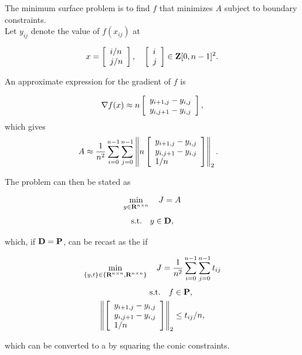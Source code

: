 \documentclass{article}
\begin{document}
    The minimum surface problem is to find $f$ that minimizes $A$ subject to boundary constraints.\\
    Let $y_{ij}$ denote the value of $f(x_{ij})$ at 
    
    \begin{align*}
        x=\left[\begin{array}{lllllllllllllllllll}i/n \\ j/n\end{array}\right],\quad  \left[\begin{array}{lllllllllllllllllll}i\\j\end{array}\right]\in\textbf{Z}[0,n-1]^2.
    \end{align*}
    
    An approximate expression for the gradient of $f$ is 

    \begin{align*}
        \nabla f(x)\approx n \left[\begin{array}{lllllllllllllllllll}y_{i+1,j}-y_{i,j}\\y_{i,j+1}-y_{i,j}\end{array}\right],
    \end{align*}
    which gives
    \begin{align*}
        A&\approx\frac{1}{n^2}\sum_{i=0}^{n-1}\sum_{j=0}^{n-1}
        \left\|n\left[\begin{array}{lllllllllllllllllll} y_{i+1,j}-y_{i,j}\\ y_{i,j+1}-y_{i,j} \\1/n\end{array}\right]\right\|_2.
    \end{align*}

    The problem can then be stated as

    \begin{align*}
        \min_{y\in\textbf{R}^{n\times n}}\quad J = A
    \end{align*}
    \begin{align*}
        \text{s.t.}\quad y\in\textbf{D},
    \end{align*}

    which, if $\textbf{D}=\textbf{P}$, can be recast as the \SOCP if 

    \begin{align*}
        \min_{\{y,t\}\in\{\textbf{R}^{n\times n},\textbf{R}^{n\times n}\}}\quad J = \frac{1}{n^2}\sum_{i=0}^{n-1}\sum_{j=0}^{n-1} t_{ij}
    \end{align*}
    \begin{align*}
        \text{s.t.}\quad f&\in\textbf{P},\\
        \left\|\left[\begin{array}{lllllllllllllllllll} y_{i+1,j}-y_{i,j}\\ y_{i,j+1}-y_{i,j} \\1/n\end{array}\right]\right\|_2&\leq t_{ij}/n,
    \end{align*}

    which can be converted to a \QCQP by squaring the conic constraints.

\end{document}
